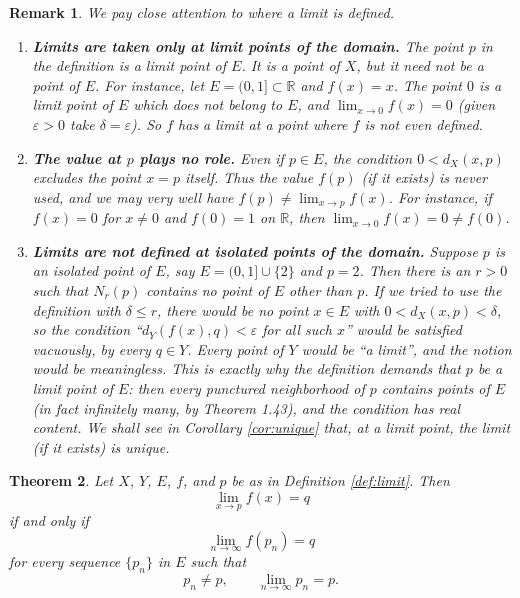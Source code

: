 \documentclass{article}
\theoremstyle{mythm}
\newtheorem{theorem}{Theorem}[section]
\newtheorem{remark}[theorem]{Remark}
\begin{document}
\begin{remark}\label{rem:limitpoint}
We pay close attention to \textit{where} a limit is defined.

\begin{enumerate}
    \item \textbf{Limits are taken only at limit points of the domain.} The point $p$ in the definition is a limit point of $E$. It is a point of $X$, but it need \textit{not} be a point of $E$. For instance, let $E = (0,1] \subset \mathbb{R}$ and $f(x) = x$. The point $0$ is a limit point of $E$ which does not belong to $E$, and $\lim_{x\to 0} f(x) = 0$ (given $\varepsilon > 0$ take $\delta = \varepsilon$). So $f$ has a limit at a point where $f$ is not even defined.

    \item \textbf{The value at $p$ plays no role.} Even if $p \in E$, the condition $0 < d_X(x,p)$ excludes the point $x = p$ itself. Thus the value $f(p)$ (if it exists) is never used, and we may very well have $f(p) \neq \lim_{x\to p} f(x)$. For instance, if $f(x) = 0$ for $x \neq 0$ and $f(0) = 1$ on $\mathbb{R}$, then $\lim_{x\to 0} f(x) = 0 \neq f(0)$.

    \item \textbf{Limits are not defined at isolated points of the domain.} Suppose $p$ is an isolated point of $E$, say $E = (0,1] \cup \{2\}$ and $p = 2$. Then there is an $r > 0$ such that $N_r(p)$ contains no point of $E$ other than $p$. If we tried to use the definition with $\delta \leq r$, there would be \textit{no} point $x \in E$ with $0 < d_X(x,p) < \delta$, so the condition ``$d_Y(f(x),q) < \varepsilon$ for all such $x$'' would be satisfied vacuously, by \textit{every} $q \in Y$. Every point of $Y$ would be ``a limit'', and the notion would be meaningless. This is exactly why the definition demands that $p$ be a limit point of $E$: then every punctured neighborhood of $p$ contains points of $E$ (in fact infinitely many, by Theorem 1.43), and the condition has real content. We shall see in Corollary \ref{cor:unique} that, at a limit point, the limit (if it exists) is unique.
\end{enumerate}
\end{remark}

\begin{theorem}\label{thm:seqlimit}
Let $X$, $Y$, $E$, $f$, and $p$ be as in Definition \ref{def:limit}. Then
\[
\lim_{x \to p} f(x) = q
\]
if and only if
\[
\lim_{n \to \infty} f(p_n) = q
\]
for every sequence $\{p_n\}$ in $E$ such that
\[
p_n \neq p, \qquad \lim_{n\to\infty} p_n = p.
\]
\end{theorem}
\end{document}
